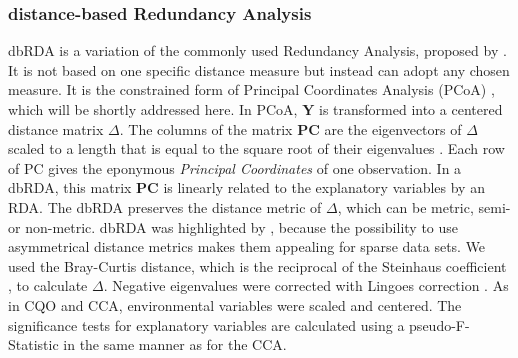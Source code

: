 \documentclass[a4paper,11pt]{article}
\begin{document}
	\subsubsection*{distance-based Redundancy Analysis}
	    dbRDA is a variation of the commonly used Redundancy Analysis, proposed by \citet{Legendre1999}.
        It is not based on one specific distance measure but instead can adopt any chosen measure.
		It is the constrained form of Principal Coordinates Analysis (PCoA) \citep{Legendre1999}, which will be shortly addressed here.
		In PCoA, $\mathbf{Y}$ is transformed into a centered distance matrix $\Delta$.
		The columns of the matrix $\mathbf{PC}$ are the eigenvectors of $\Delta$ scaled to a length that is equal to the square root of their eigenvalues \citep{gower1966some}.
		Each row of PC gives the eponymous \textit{Principal Coordinates} of one observation.
		In a dbRDA, this matrix $\mathbf{PC}$ is linearly related to the explanatory variables by an RDA.
		The dbRDA preserves the distance metric of $\Delta$, which can be metric, semi- or non-metric.
		dbRDA was highlighted by \citet{Szocs2015}, because the possibility to use asymmetrical distance metrics makes them appealing for sparse data sets. 
	    We used the Bray-Curtis distance, which is the reciprocal of the Steinhaus coefficient  \citep{motyka1947zadaniach}, to calculate $\Delta$.
		Negative eigenvalues were corrected with Lingoes correction \citep{lingoes1971some}.
		As in CQO and CCA, environmental variables were scaled and centered. 
		The significance tests for explanatory variables are calculated using a pseudo-F-Statistic in the same manner as for the CCA.\\
		
\end{document}
